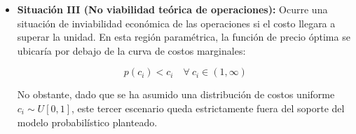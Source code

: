 \documentclass[12pt]{article}
\begin{document}
\begin{itemize}
\begin{itemize}
        $$ p(c_{i}) = c_{i} \quad \text{cuando} \ c_{i} = 1 $$
       
        \item \textbf{Situación III (No viabilidad teórica de operaciones):} Ocurre una situación de inviabilidad económica de las operaciones si el costo llegara a superar la unidad. En esta región paramétrica, la función de precio óptima se ubicaría por debajo de la curva de costos marginales:
       
        $$ p(c_{i}) < c_{i} \quad \forall \ c_{i} \in (1, \infty) $$
       
        No obstante, dado que se ha asumido una distribución de costos uniforme $c_i \sim U[0,1]$, este tercer escenario queda estrictamente fuera del soporte del modelo probabilístico planteado.
    \end{itemize}
\end{itemize}

\vspace{1cm}
\end{document}
